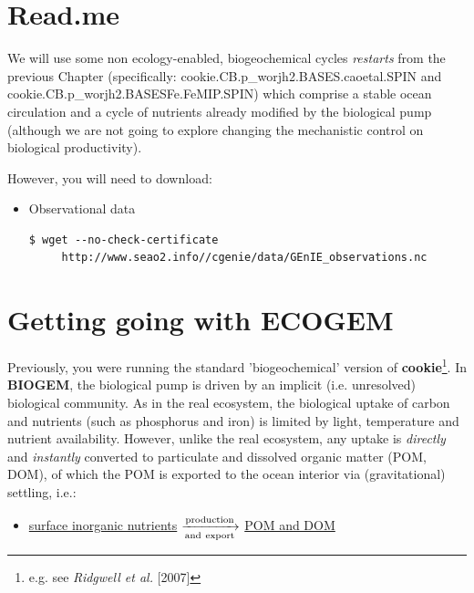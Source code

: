 \newpage

\section*{Read.me}

\vspace{2mm}
We will use some non ecology-enabled, biogeochemical cycles \textit{restarts} from the previous Chapter (specifically: \textsf{\footnotesize cookie.CB.p\_worjh2.BASES.caoetal.SPIN} and \textsf{\footnotesize  cookie.CB.p\_worjh2.BASESFe.FeMIP.SPIN}) which comprise a stable ocean circulation and a cycle of nutrients already modified by the biological pump (although we are not going to explore changing the mechanistic control on biological productivity).

\vspace{2mm}

However, you will need to download:

\begin{itemize}[noitemsep]
\vspace{2mm}
\item Observational data
\vspace{-1mm}\small\begin{verbatim}
$ wget --no-check-certificate 
     http://www.seao2.info//cgenie/data/GEnIE_observations.nc
\end{verbatim}\normalsize\vspace{-1mm}
\end{itemize}

\newpage

\section{Getting going with ECOGEM}

Previously, you were running the standard 'biogeochemical' version of \textbf{cookie}\footnote{e.g. see \textit{Ridgwell et al.} [2007]}.  In \textbf{BIOGEM}, the biological pump is driven by an implicit (i.e. unresolved) biological community. As in the real ecosystem, the biological uptake of carbon and nutrients (such as phosphorus and iron) is limited by light, temperature and nutrient availability. However, unlike the real ecosystem, any uptake is \textit{directly} and \textit{instantly} converted to particulate and dissolved organic matter (POM, DOM), of which the POM is exported to the ocean interior via (gravitational) settling, i.e.:
\vspace{4mm}
\begin{itemize}
\item \underline{surface inorganic nutrients} $\xrightarrow[\rm and~export]{\rm production}$ \underline{POM and DOM}
\end{itemize}
\vspace{4mm}

